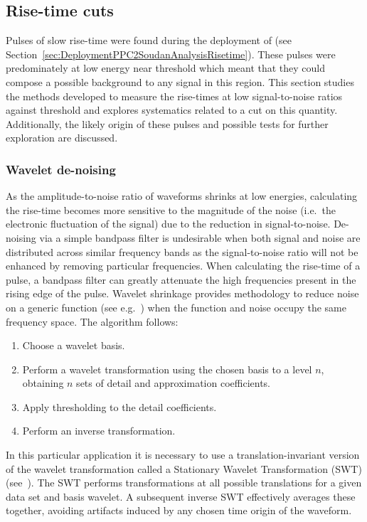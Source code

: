 		\subsection{Rise-time cuts}
	     	\label{sec:RisetimeCuts}	

	Pulses of slow rise-time were found during the deployment of  (see Section~\ref{sec:DeploymentPPC2SoudanAnalysisRisetime}).  These pulses were predominately at low energy near threshold which meant that they could compose a possible background to any signal in this region.  This section studies the methods developed to measure the rise-times at low signal-to-noise ratios against threshold and explores systematics related to a cut on this quantity.  Additionally, the likely origin of these pulses and possible tests for further exploration are discussed. 
	
			\subsubsection{Wavelet de-noising}
		     	\label{sec:RisetimeCutsWaveletDenoise}
					
	As the amplitude-to-noise ratio of waveforms shrinks at low energies, calculating the rise-time becomes more sensitive to the magnitude of the noise (i.e.~the electronic fluctuation of the signal) due to the reduction in signal-to-noise.   De-noising via a simple bandpass filter is undesirable when both signal and noise are distributed across similar frequency bands as the signal-to-noise ratio will not be enhanced by removing particular frequencies.  When calculating the rise-time of a pulse, a bandpass filter can greatly attenuate the high frequencies present in the rising edge of the pulse.  Wavelet shrinkage provides methodology to reduce noise on a generic function (see e.g.~\cite{Don95bb,Don95aa}) when the function and noise occupy the same frequency space.  The algorithm follows:
				\begin{enumerate}
					\item Choose a wavelet basis.
					\item Perform a wavelet transformation using the chosen basis to a level $n$, 
					obtaining $n$ sets of detail and approximation coefficients.
					\item Apply thresholding to the detail coefficients.
					\item Perform an inverse transformation.
				\end{enumerate}
	In this particular application it is necessary to use a translation-invariant version of the wavelet transformation called a Stationary Wavelet Transformation (SWT) (see~\cite{Coif95aa,Naso95aa}).  The SWT performs transformations at all possible translations for a given data set and basis wavelet.  A subsequent inverse SWT effectively averages these together, avoiding artifacts induced by any chosen time origin of the waveform.  
	
